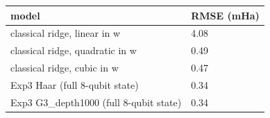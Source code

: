 \begin{tabular}{ll}
\toprule
model & RMSE (mHa) \\
\midrule
classical ridge, linear in w & 4.08 \\
classical ridge, quadratic in w & 0.49 \\
classical ridge, cubic in w & 0.47 \\
Exp3 Haar (full 8-qubit state) & 0.34 \\
Exp3 G3\_depth1000 (full 8-qubit state) & 0.34 \\
\bottomrule
\end{tabular}
